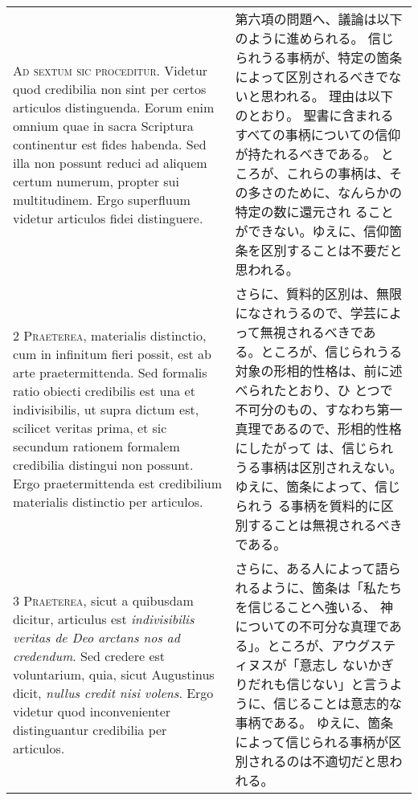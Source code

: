 \documentclass[10pt]{jsarticle} %
\begin{document}
\begin{longtable}{p{21em}p{21em}}

{\huge A}{\scshape d sextum sic proceditur}. Videtur quod
credibilia non sint per certos articulos distinguenda. Eorum enim omnium
quae in sacra Scriptura continentur est fides habenda. Sed illa non
possunt reduci ad aliquem certum numerum, propter sui multitudinem. Ergo
superfluum videtur articulos fidei distinguere.

&

第六項の問題へ、議論は以下のように進められる。
信じられうる事柄が、特定の箇条によって区別されるべきでないと思われる。
理由は以下のとおり。
聖書に含まれるすべての事柄についての信仰が持たれるべきである。
ところが、これらの事柄は、その多さのために、なんらかの特定の数に還元され
 ることができない。ゆえに、信仰箇条を区別することは不要だと思われる。

\\


{\scshape 2 Praeterea}, materialis distinctio, cum
in infinitum fieri possit, est ab arte praetermittenda. Sed formalis
ratio obiecti credibilis est una et indivisibilis, ut supra dictum est,
scilicet veritas prima, et sic secundum rationem formalem credibilia
distingui non possunt. Ergo praetermittenda est credibilium materialis
distinctio per articulos.

&
さらに、質料的区別は、無限になされうるので、学芸によって無視されるべきであ
 る。ところが、信じられうる対象の形相的性格は、前に述べられたとおり、ひ
 とつで不可分のもの、すなわち第一真理であるので、形相的性格にしたがって
 は、信じられうる事柄は区別されえない。ゆえに、箇条によって、信じられう
 る事柄を質料的に区別することは無視されるべきである。

\\


{\scshape 3 Praeterea}, sicut a quibusdam dicitur, articulus est
{\itshape indivisibilis veritas de Deo arctans nos ad credendum}. Sed
credere est voluntarium, quia, sicut Augustinus dicit, {\itshape nullus
credit nisi volens}. Ergo videtur quod inconvenienter distinguantur
credibilia per articulos.

&

さらに、ある人によって語られるように、箇条は「私たちを信じることへ強いる、
 神についての不可分な真理である」。ところが、アウグスティヌスが「意志し
 ないかぎりだれも信じない」と言うように、信じることは意志的な事柄である。
 ゆえに、箇条によって信じられる事柄が区別されるのは不適切だと思われる。

\\



\end{longtable}
\end{document}
